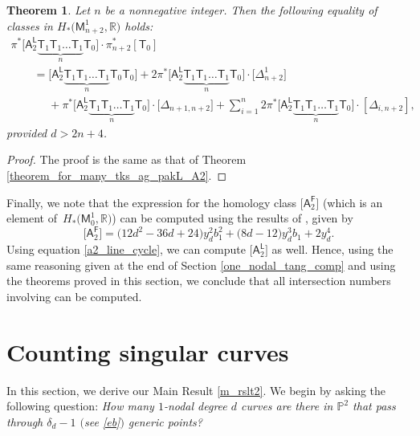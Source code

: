 \documentclass[pdftex]{sigma}
\numberwithin{equation}{section}
\newtheorem{thm}{Theorem}[section]
\begin{document}
\begin{thm}\label{theorem_for_many_tks_ag_pakL_A2_T0}
Let $n$ be a nonnegative integer.
Then the following equality of classes in $H_*\bigl(\mathsf{M}_{{n+2}}^1, \mathbb{R}\bigr)$ holds:
\begin{gather*}%
\pi^{\ast}\bigl[\mathsf{A}_2^{\mathsf{L}} \underbrace{\mathsf{T}_{1}\mathsf{T}_{1} \dots \mathsf{T}_{1}}_{n} \mathsf{T}_0\bigr]\cdot
\pi_{n+2}^{\ast}[\mathsf{T}_0] \\
\qquad =
\bigl[\mathsf{A}_2^{\mathsf{L}} \underbrace{\mathsf{T}_{1}\mathsf{T}_{1} \dots \mathsf{T}_{1}}_{n} \mathsf{T}_{0} \mathsf{T}_{0}\bigr]
+ 2 \pi^{\ast} \bigl[\mathsf{A}_2^{\mathsf{L}} \underbrace{\mathsf{T}_{1}\mathsf{T}_{1} \dots \mathsf{T}_{1}}_{n} \mathsf{T}_0\bigr]
\cdot \bigl[\Delta_{n+2}^1\bigr]  \\[-1mm]
\phantom{\qquad =}{} + \pi^{\ast} \bigl[\mathsf{A}_2^{\mathsf{L}} \underbrace{\mathsf{T}_{1}\mathsf{T}_{1} \dots \mathsf{T}_{1}}_{n} \mathsf{T}_0\bigr]
\cdot \bigl[\Delta_{n+1, {n+2}}\bigr]
  + \sum_{i=1}^{n} 2 \pi^{\ast}\bigl[\mathsf{A}_2^{\mathsf{L}} \underbrace{\mathsf{T}_{1}\mathsf{T}_{1} \dots
\mathsf{T}_{1}}_{n} \mathsf{T}_0\bigr] \cdot [\Delta_{i, {n+2}}],
\end{gather*}
provided $d > 2n+4$.
\end{thm}

\begin{proof}
The proof is the same as that of Theorem \ref{theorem_for_many_tks_ag_pakL_A2}.
\end{proof}

Finally, we note that
the expression for the homology class $\bigl[\mathsf{A}_2^{\mathsf{F}}\bigr]$
\big(which is an element of~${H_{*}\bigl(\mathsf{M}^1_{0}, \mathbb{R}\bigr)}$\big) can be computed using the
results of \cite{R.M}, given by
\[%
\bigl[\mathsf{A}_2^{\mathsf{F}}\bigr]  = \bigl(12d^2-36d+24\bigr) y_d^2 b_1^2 + \bigl(8d-12\bigr)y_d^3 b_1 + 2 y_d^4.
\]
Using equation \eqref{a2_line_cycle}, we can compute
$\bigl[\mathsf{A}_2^{\mathsf{L}}\bigr]$ as well.
Hence, using the same reasoning given at the end of Section \ref{one_nodal_tang_comp}
and using the theorems proved in this section, we conclude that all intersection numbers
involving 
can be computed.

\section{Counting singular curves}\label{singularity_in_our_format}
In this section, we derive our Main Result \ref{m_rslt2}.
We begin by asking the following question:
{\it How many $1$-nodal degree $d$ curves are there in $\mathbb{P}^2$
that pass through $\delta_d-1$ $($see \eqref{eb}$)$ generic points?}
\end{document}
